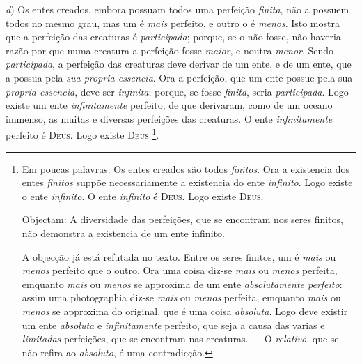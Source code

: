  \emph{d}) Os entes creados, embora possuam todos uma perfeição \emph{finita}, não a possuem todos no mesmo grau, mas um é \emph{mais} perfeito, e outro o é \emph{menos}. Isto mostra que a perfeição das creaturas é \emph{participada}; porque, se o não fosse, não haveria razão por que numa creatura a perfeição fosse \emph{maior}, e noutra \emph{menor}. Sendo \emph{participada}, a perfeição das creaturas deve derivar de um ente, e de um ente, que a possua pela \emph{sua propria essencia}. Ora a perfeição, que um ente possue pela sua \emph{propria essencia}, deve ser \emph{infinita}; porque, se fosse \emph{finita}, seria \emph{participada}. Logo existe um ente \emph{infinitamente} perfeito, de que derivaram, como de um oceano immenso, as muitas e diversas perfeições das creaturas. O ente \emph{infinitamente} perfeito é \textsc{Deus}. Logo existe \textsc{Deus} \footnote{Em poucas palavras: Os entes creados são todos \emph{finitos}. Ora a existencia dos entes \emph{finitos} suppõe necessariamente a existencia do ente \emph{infinito}. Logo existe o ente \emph{infinito}. O ente \emph{infinito} é \textsc{Deus}. Logo existe \textsc{Deus}.\par Objectam: A diversidade das perfeições, que se encontram nos seres finitos, não demonstra a existencia de um ente infinito.\par A objecção já está refutada no texto. Entre os seres finitos, um é \emph{mais} ou \emph{menos} perfeito que o outro. Ora uma coisa diz-se \emph{mais} ou \emph{menos} perfeita, emquanto \emph{mais} ou \emph{menos} se approxima de um ente \emph{absolutamente perfeito}: assim uma photographia diz-se \emph{mais} ou \emph{menos} perfeita, emquanto \emph{mais} ou \emph{menos} se approxima do original, que é uma coisa \emph{absoluta}. Logo deve existir um ente \emph{absoluta} e \emph{infinitamente} perfeito, que seja a causa das varias e \emph{limitadas} perfeições, que se encontram nas creaturas. --- O \emph{relativo}, que se não refira ao \emph{absoluto}, é uma contradicção.}.

